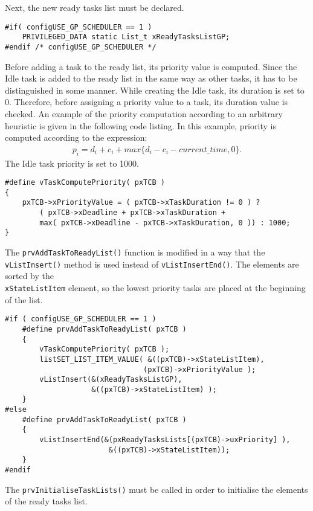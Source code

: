 Next, the new ready tasks list must be declared.
\begin{lstlisting}[frame=none, label={ready_list}, caption={Declaration of the new ready tasks list.}, captionpos=b]
#if( configUSE_GP_SCHEDULER == 1 )
	PRIVILEGED_DATA static List_t xReadyTasksListGP;
#endif /* configUSE_GP_SCHEDULER */
\end{lstlisting}
Before adding a task to the ready list, its priority value is computed. 
Since the Idle task is added to the ready list in the same way as other tasks, it has to be distinguished in some manner. 
While creating the Idle task, its duration is set to 0.
Therefore, before assigning a priority value to a task, its duration value is checked. 
An example of the priority computation according to an arbitrary heuristic is given in the following code listing. 
In this example, priority is computed according to the expression:
\begin{align*}
p_i = d_i + c_i + max\{ d_i - c_i - current\_time, 0 \}.
\end{align*}
The Idle task priority is set to 1000.
\begin{lstlisting}[frame=none, label={ready_list}, caption={Macro function for priority computation.}, captionpos=b]
#define vTaskComputePriority( pxTCB )
{
	pxTCB->xPriorityValue = ( pxTCB->xTaskDuration != 0 ) ? 
		( pxTCB->xDeadline + pxTCB->xTaskDuration + 
		max( pxTCB->xDeadline - pxTCB->xTaskDuration, 0 )) : 1000;
}	
\end{lstlisting}
The \verb$prvAddTaskToReadyList()$ function is modified in a way that the \verb$vListInsert()$ method is used instead of \verb$vListInsertEnd()$. 
The elements are sorted by the \\\verb$xStateListItem$ element, so the lowest priority tasks are placed at the beginning of the list. 
\begin{lstlisting}[frame=none, label={ready_add}, caption={Adding a new task to the ready list.}, captionpos=b]
#if ( configUSE_GP_SCHEDULER == 1 )
	#define prvAddTaskToReadyList( pxTCB )
	{
		vTaskComputePriority( pxTCB );
		listSET_LIST_ITEM_VALUE( &((pxTCB)->xStateListItem), 
								(pxTCB)->xPriorityValue );
		vListInsert(&(xReadyTasksListGP), 
					&((pxTCB)->xStateListItem) );
	}																								
#else 																								
	#define prvAddTaskToReadyList( pxTCB )
	{
		vListInsertEnd(&(pxReadyTasksLists[(pxTCB)->uxPriority] ), 
						&((pxTCB)->xStateListItem));
	}
#endif
\end{lstlisting}
The \verb$prvInitialiseTaskLists()$ must be called in order to initialise the elements of the ready tasks list.
